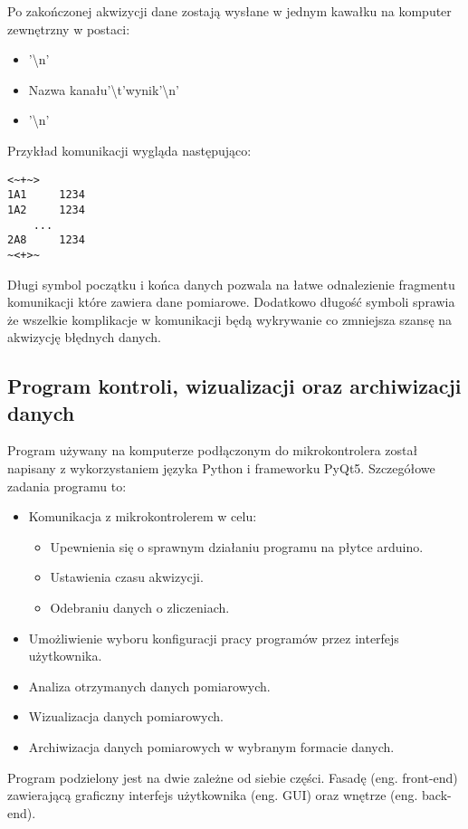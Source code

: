 Po zakończonej akwizycji dane zostają wysłane w jednym kawałku na komputer zewnętrzny w postaci:
\begin{itemize}
        \item \detokenize{<~+~>}'\textbackslash n'
        \item {Nazwa kanału}'\textbackslash t'{wynik}'\textbackslash n'
        \item \detokenize{~<+>~}'\textbackslash n'
\end{itemize}
Przykład komunikacji wygląda następująco:
\begin{lstlisting}
<~+~>
1A1     1234
1A2     1234 
    ...
2A8     1234
~<+>~
\end{lstlisting}

Długi symbol początku i końca danych pozwala na łatwe odnalezienie fragmentu komunikacji które zawiera dane pomiarowe. Dodatkowo długość symboli sprawia że wszelkie komplikacje w komunikacji będą wykrywanie co zmniejsza szansę na akwizycję błędnych danych. 

\subsection{Program kontroli, wizualizacji oraz archiwizacji danych}

Program używany na komputerze podłączonym do mikrokontrolera został napisany z wykorzystaniem języka Python i frameworku PyQt5.
Szczegółowe zadania programu to:
\begin{itemize}
        \item Komunikacja z mikrokontrolerem w celu:
        \begin{itemize}
                \item Upewnienia się o sprawnym działaniu programu na płytce arduino.
                \item Ustawienia czasu akwizycji.
                \item Odebraniu danych o zliczeniach. 
        \end{itemize}
        \item Umożliwienie wyboru konfiguracji pracy programów przez interfejs użytkownika.
        \item Analiza otrzymanych danych pomiarowych.
        \item Wizualizacja danych pomiarowych.
        \item Archiwizacja danych pomiarowych w wybranym formacie danych.
\end{itemize}

Program podzielony jest na dwie zależne od siebie części. Fasadę (eng. front-end) zawierającą graficzny interfejs użytkownika (eng. GUI) oraz wnętrze (eng. back-end).


